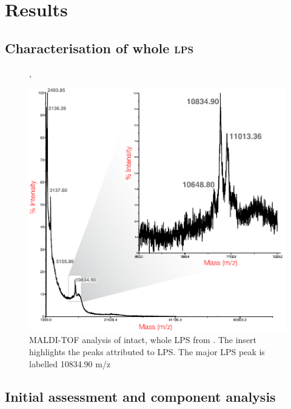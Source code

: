\section{Results} %
\label{sec:results}
	\subsection{Characterisation of whole \textsc{lps}} %
	\label{sub:characterisation_of_whole_lps}
		\begin{figure}[htb],
			\begin{center}
				\includegraphics[]{lps_chapter/img/malditof.pdf}
			\end{center}
			\caption[\Ac{MALDI-TOF} analysis of intact, whole \ac{LPS} from \caulobacter.]{\ac{MALDI-TOF} analysis of intact, whole \ac{LPS} from \caulobacter. The insert highlights the peaks attributed to \ac{LPS}. The major \ac{LPS} peak is labelled 10834.90 m/z}
			\label{fig:lpsmalditof}
		\end{figure}

	\subsection{Initial assessment and component analysis} %
	\label{sub:initial_assessment_and_component_analysis}

